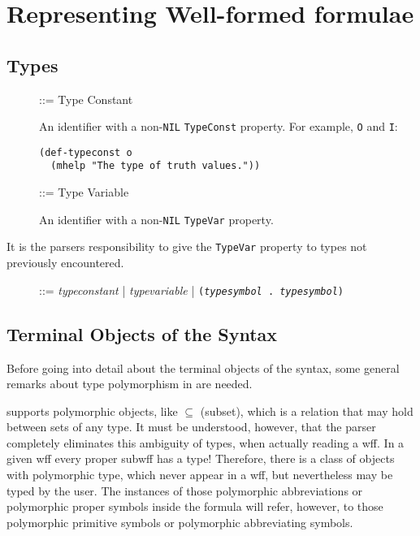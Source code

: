 \chapter{Representing Well-formed formulae}

\section{Types}

\begin{description}
\item [ ] ::= Type Constant

An identifier with a non-{\tt NIL} {\tt TypeConst} property.
For example, {\tt O} and {\tt I}:
\begin{verbatim}
(def-typeconst o
  (mhelp "The type of truth values."))
\end{verbatim}

\item [ ] ::= Type Variable

 An identifier with a non-{\tt NIL} {\tt TypeVar} property.
\end{description}
It is the parsers responsibility to give the {\tt TypeVar} property to types 
not previously encountered.

\begin{description}
\item [ ] ::= {\it typeconstant} | {\it typevariable} | 
{\tt ({\it typesymbol} . {\it typesymbol})}
\end{description}

\section{Terminal Objects of the Syntax}\label{terminalobjects}

Before going into detail about the terminal objects of the syntax,
some general remarks about type polymorphism in \TPS are needed.

\TPS supports polymorphic objects, like $\subseteq$ (subset), which is
a relation that may hold between sets of any type.  It must be understood,
however, that the parser completely eliminates this ambiguity of types,
when actually reading a wff.  In a given wff every proper subwff has
a type!  Therefore, there is a class of objects with polymorphic type,
which never appear in a wff, but nevertheless may be typed by the user.
The instances of those polymorphic abbreviations or polymorphic proper
symbols inside the formula will refer, however, to those polymorphic primitive
symbols or polymorphic abbreviating symbols.

